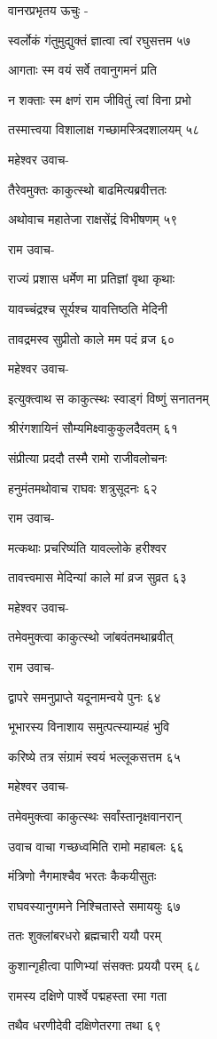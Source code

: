 वानरप्रभृतय ऊचुः -

स्वर्लोकं गंतुमुद्युक्तं ज्ञात्वा त्वां रघुसत्तम ५७

आगताः स्म वयं सर्वे तवानुगमनं प्रति

न शक्ताः स्म क्षणं राम जीवितुं त्वां विना प्रभो

तस्मात्त्वया विशालाक्ष गच्छामस्त्रिदशालयम् ५८

महेश्वर उवाच-

तैरेवमुक्तः काकुत्स्थो बाढमित्यब्रवीत्ततः

अथोवाच महातेजा राक्षसेंद्रं विभीषणम् ५९

राम उवाच-

राज्यं प्रशास धर्मेण मा प्रतिज्ञां वृथा कृथाः

यावच्चंद्रश्च सूर्यश्च यावत्तिष्ठति मेदिनी

तावद्रमस्व सुप्रीतो काले मम पदं व्रज ६०

महेश्वर उवाच-

इत्युक्त्वाथ स काकुत्स्थः स्वाड्गं विष्णुं सनातनम्

श्रीरंगशायिनं सौम्यमिक्ष्वाकुकुलदैवतम् ६१

संप्रीत्या प्रददौ तस्मै रामो राजीवलोचनः

हनुमंतमथोवाच राघवः शत्रुसूदनः ६२

राम उवाच-

मत्कथाः प्रचरिष्यंति यावल्लोके हरीश्वर

तावत्त्वमास मेदिन्यां काले मां व्रज सुव्रत ६३

महेश्वर उवाच-

तमेवमुक्त्वा काकुत्स्थो जांबवंतमथाब्रवीत्

राम उवाच-

द्वापरे समनुप्राप्ते यदूनामन्वये पुनः ६४

भूभारस्य विनाशाय समुत्पत्स्याम्यहं भुवि

करिष्ये तत्र संग्रामं स्वयं भल्लूकसत्तम ६५

महेश्वर उवाच-

तमेवमुक्त्वा काकुत्स्थः सर्वांस्तानृक्षवानरान्

उवाच वाचा गच्छध्वमिति रामो महाबलः ६६

मंत्रिणो नैगमाश्चैव भरतः कैकयीसुतः

राघवस्यानुगमने निश्चितास्ते समाययुः ६७

ततः शुक्लांबरधरो ब्रह्मचारी ययौ परम्

कुशान्गृहीत्वा पाणिभ्यां संसक्तः प्रययौ परम् ६८

रामस्य दक्षिणे पार्श्वे पद्महस्ता रमा गता

तथैव धरणीदेवी दक्षिणेतरगा तथा ६९

